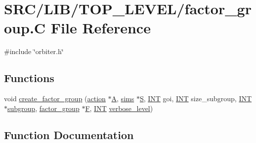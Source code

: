 \hypertarget{factor__group_8_c}{}\section{S\+R\+C/\+L\+I\+B/\+T\+O\+P\+\_\+\+L\+E\+V\+E\+L/factor\+\_\+group.C File Reference}
\label{factor__group_8_c}
{\ttfamily \#include \char`\"{}orbiter.\+h\char`\"{}}\newline
\subsection*{Functions}
\begin{DoxyCompactItemize}
\item 
void \mbox{\hyperlink{factor__group_8_c_a82198eab16831c56b5d16a5f3aa7cb84}{create\+\_\+factor\+\_\+group}} (\mbox{\hyperlink{classaction}{action}} $\ast$\mbox{\hyperlink{simeon_8_c_a97833f04c3a9c008df5521a2fc291bb4}{A}}, \mbox{\hyperlink{classsims}{sims}} $\ast$\mbox{\hyperlink{simeon_8_c_adab47f8243f1b5a2c31df2535d6b37d0}{S}}, \mbox{\hyperlink{galois_8h_a09fddde158a3a20bd2dcadb609de11dc}{I\+NT}} goi, \mbox{\hyperlink{galois_8h_a09fddde158a3a20bd2dcadb609de11dc}{I\+NT}} size\+\_\+subgroup, \mbox{\hyperlink{galois_8h_a09fddde158a3a20bd2dcadb609de11dc}{I\+NT}} $\ast$\mbox{\hyperlink{classsubgroup}{subgroup}}, \mbox{\hyperlink{structfactor__group}{factor\+\_\+group}} $\ast$\mbox{\hyperlink{simeon_8_c_a21a61c535ff7d9d4b674461d3b19fffa}{F}}, \mbox{\hyperlink{galois_8h_a09fddde158a3a20bd2dcadb609de11dc}{I\+NT}} \mbox{\hyperlink{simeon_8_c_a818073fbcc2f439e7c56952f67386122}{verbose\+\_\+level}})
\end{DoxyCompactItemize}


\subsection{Function Documentation}
\mbox{\label{factor__group_8_c_a82198eab16831c56b5d16a5f3aa7cb84}} 
